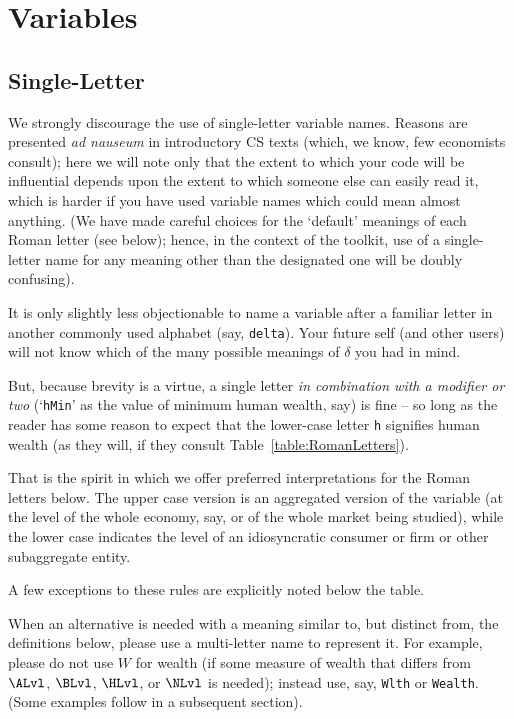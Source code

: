 \documentclass[12pt]{\econtex}
\begin{document}
\pagebreak

\section{Variables}

\subsection{Single-Letter}

We strongly discourage the use of single-letter variable names.  Reasons are presented \textit{ad nauseum} in introductory CS texts (which, we know, few economists consult); here we will note only that the extent to which your code will be influential depends upon the extent to which someone else can easily read it, which is harder if you have used variable names which could mean almost anything.  (We have made careful choices for the `default' meanings of each Roman letter (see below); hence, in the context of the toolkit, use of a single-letter name for any meaning other than the designated one will be doubly confusing).

It is only slightly less objectionable to name a variable after a familiar letter in another commonly used alphabet (say, \texttt{delta}).  Your future self (and other users) will not know which of the many possible meanings of $\delta$ you had in mind.

But, because brevity is a virtue, a single letter \textit{in combination with a modifier or two} (`\texttt{hMin}' as the value of minimum human wealth, say) is fine -- so long as the reader has some reason to expect that the lower-case letter \texttt{h} signifies human wealth (as they will, if they consult Table~\ref{table:RomanLetters}).

That is the spirit in which we offer preferred interpretations for the Roman letters below.  The upper case version is an aggregated version of the variable (at the level of the whole economy, say, or of the whole market being studied), while the lower case indicates the level of an idiosyncratic consumer or firm or other subaggregate entity.  

A few exceptions to these rules are explicitly noted below the table.

When an alternative is needed with a meaning similar to, but distinct from, the definitions below, please use a multi-letter name to represent it.  For example, please do not use $W$ for wealth (if some measure of wealth that differs from $\ALvl$, $\BLvl$, $\HLvl$, or $\NLvl$ is needed); instead use, say, \texttt{Wlth} or \texttt{Wealth}.  (Some examples follow in a subsequent section).
\end{document}
